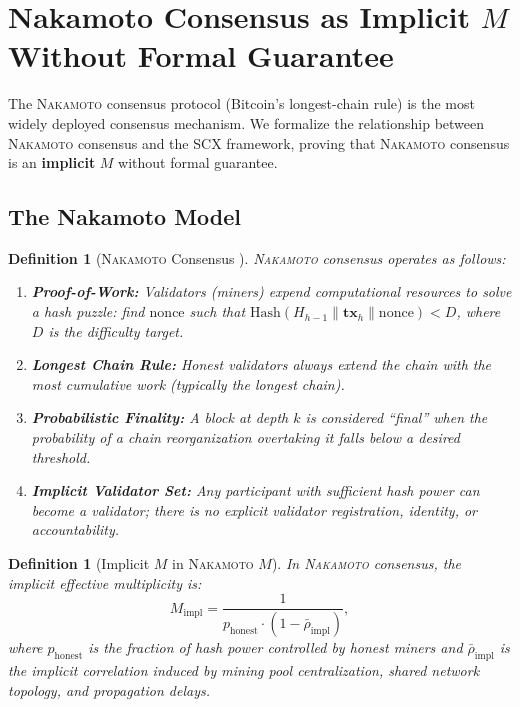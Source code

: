 \documentclass[11pt,a4paper]{article}
\newtheorem{definition}[theorem]{Definition}
\theoremstyle{definition}
\newcommand{\SCX}{\textsc{SCX}}
\newcommand{\Nakamoto}{\textsc{Nakamoto}}
\begin{document}
\section{Nakamoto Consensus as Implicit $M$ Without Formal Guarantee}
\label{sec:nakamoto}
The \Nakamoto{} consensus protocol (Bitcoin's longest-chain rule) is the most widely deployed consensus mechanism. We formalize the relationship between \Nakamoto{} consensus and the \SCX{} framework, proving that \Nakamoto{} consensus is an \textbf{implicit} $M$ without formal guarantee.
\subsection{The Nakamoto Model}
\begin{definition}[\Nakamoto{} Consensus ]
\label{def:nakamoto}
\Nakamoto{} consensus operates as follows:
\begin{enumerate}[label=(\roman*)]
    \item \textbf{Proof-of-Work:} Validators (miners) expend computational resources to solve a hash puzzle: find $\mathrm{nonce}$ such that $\mathrm{Hash}(H_{h-1} \parallel \mathbf{tx}_h \parallel \mathrm{nonce}) < D$, where $D$ is the difficulty target.
    \item \textbf{Longest Chain Rule:} Honest validators always extend the chain with the most cumulative work (typically the longest chain).
    \item \textbf{Probabilistic Finality:} A block at depth $k$ is considered ``final'' when the probability of a chain reorganization overtaking it falls below a desired threshold.
    \item \textbf{Implicit Validator Set:} Any participant with sufficient hash power can become a validator; there is no explicit validator registration, identity, or accountability.
\end{enumerate}
\end{definition}
\begin{definition}[Implicit $M$ in \Nakamoto{} $M$]
\label{def:implicit_M}
In \Nakamoto{} consensus, the implicit effective multiplicity is:
\begin{equation}
    M_{\mathrm{impl}} = \frac{1}{p_{\mathrm{honest}} \cdot (1 - \bar{\rho}_{\mathrm{impl}})},
    \label{eq:implicit_M}
\end{equation}
where $p_{\mathrm{honest}}$ is the fraction of hash power controlled by honest miners and $\bar{\rho}_{\mathrm{impl}}$ is the implicit correlation induced by mining pool centralization, shared network topology, and propagation delays.
\end{definition}
\end{document}
